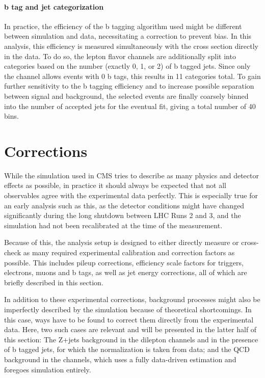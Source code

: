 \paragraph{b tag and jet categorization}

In practice, the efficiency of the b tagging algorithm used might be different between simulation and data, necessitating a correction to prevent bias. In this analysis, this efficiency is measured simultaneously with the cross section directly in the data. To do so, the lepton flavor channels are additionally split into categories based on the number (exactly 0, 1, or 2) of b tagged jets. Since only the \emu channel allows events with 0 b tags, this results in 11 categories total. To gain further sensitivity to the b tagging efficiency and to increase possible separation between \ttbar signal and background, the selected events are finally coarsely binned into the number of accepted jets for the eventual fit, giving a total number of 40 bins.


\section{Corrections}
\label{sec:ttxs:corrections}

While the simulation used in CMS tries to describe as many physics and detector effects as possible, in practice it should always be expected that not all observables agree with the experimental data perfectly. This is especially true for an early analysis such as this, as the detector conditions might have changed significantly during the long shutdown between LHC Runs 2 and 3, and the simulation had not been recalibrated at the time of the measurement. 

Because of this, the analysis setup is designed to either directly measure or cross-check as many required experimental calibration and correction factors as possible. This includes pileup corrections, efficiency scale factors for triggers, electrons, muons and b tags, as well as jet energy corrections, all of which are briefly described in this section.

In addition to these experimental corrections, background processes might also be imperfectly described by the simulation because of theoretical shortcomings. In this case, ways have to be found to correct them directly from the experimental data. Here, two such cases are relevant and will be presented in the latter half of this section: The Z+jets background in the dilepton channels and in the presence of b tagged jets, for which the normalization is taken from data; and the QCD background in the \ljets channels, which uses a fully data-driven estimation and foregoes simulation entirely.

